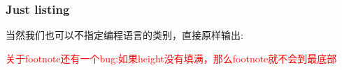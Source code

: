 \subsubsection{Just listing}
当然我们也可以不指定编程语言的类别，直接原样输出:
\begin{bytes}
\newenvironment{definition}[1][]{%
        \stepcounter{definition}%
        \begin{tcolorbox}[%
            enhanced,
            arc=3pt,
            frame hidden,
}{\end{tcolorbox}}
\end{bytes}


\vfill
\textcolor{red}{\kaishu 关于footnote还有一个bug:如果height没有填满，那么footnote就不会到最底部}
